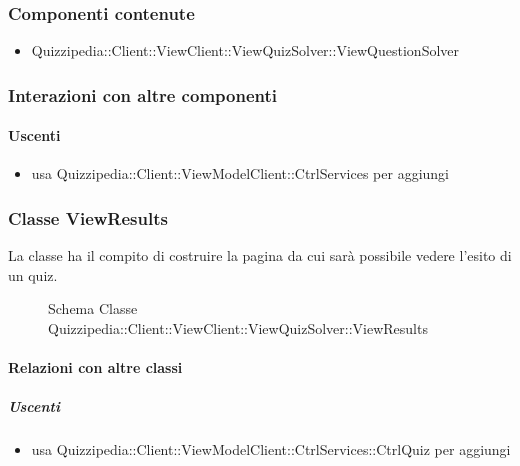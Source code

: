 \subsubsection{Componenti contenute}
\begin{itemize}
\item Quizzipedia::Client::ViewClient::ViewQuizSolver::ViewQuestionSolver
\end{itemize}
\subsubsection{Interazioni con altre componenti}
\paragraph{Uscenti}
\begin{itemize}
\item usa Quizzipedia::Client::ViewModelClient::CtrlServices per aggiungi
\end{itemize}
\subsubsection{Classe ViewResults}
La classe ha il compito di costruire la pagina da cui sarà possibile vedere l'esito di un quiz.
\begin{figure}[H]
\centering
\noindent{}
\caption[Schema Classe ViewResults]{Schema Classe Quizzipedia::Client::ViewClient::ViewQuizSolver::ViewResults}
\end{figure}
\paragraph{Relazioni con altre classi}
\subparagraph{Uscenti}
\begin{itemize}
\item usa Quizzipedia::Client::ViewModelClient::CtrlServices::CtrlQuiz per aggiungi
\end{itemize}

